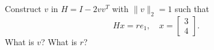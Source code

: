 \documentclass[12pt, leqno]{article}
\begin{document}

Construct $v$ in $H = I-2vv^T$ with $\|v\|_2 = 1$ such that
\[
  H x = r e_1, \quad x = \begin{bmatrix} 3 \\ 4 \end{bmatrix}.
\]
What is $v$?  What is $r$?
\end{document}
